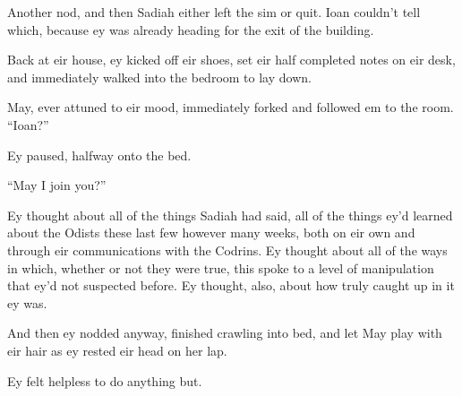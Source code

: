 \vspace{1.5pt}

Another nod, and then Sadiah either left the sim or quit. Ioan couldn't tell which, because ey was already heading for the exit of the building.

\vspace{2pt}

Back at eir house, ey kicked off eir shoes, set eir half completed notes on eir desk, and immediately walked into the bedroom to lay down.

\vspace{2pt}

May, ever attuned to eir mood, immediately forked and followed em to the room. ``Ioan?''

\vspace{2pt}

Ey paused, halfway onto the bed.

\vspace{2pt}

``May I join you?''

\vspace{2pt}

Ey thought about all of the things Sadiah had said, all of the things ey'd learned about the Odists these last few however many weeks, both on eir own and through eir communications with the Codrins. Ey thought about all of the ways in which, whether or not they were true, this spoke to a level of manipulation that ey'd not suspected before. Ey thought, also, about how truly caught up in it ey was.\pagebreak

And then ey nodded anyway, finished crawling into bed, and let May play with eir hair as ey rested eir head on her lap.

Ey felt helpless to do anything but.
